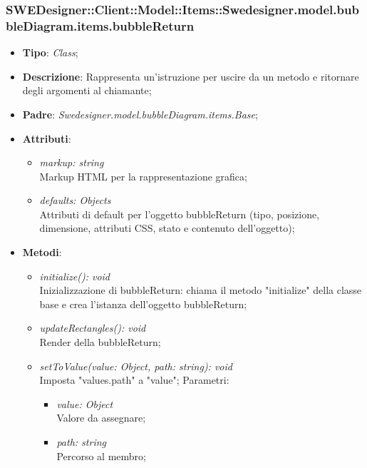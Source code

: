 \documentclass[../DefinizioneDiProdotto.tex]{subfiles}
\begin{document}
			\subsubsection{SWEDesigner::Client::Model::Items::Swedesigner.model.bubbleDiagram.items.bubbleReturn}
			\hypertarget{SWEDesigner::Client::Model::Items::Swedesigner.model.bubbleDiagram.items.bubbleReturn}{}
			\begin{itemize}
				\item \textbf{Tipo}: \emph{Class};
				\item \textbf{Descrizione}: Rappresenta un'istruzione per uscire da un metodo e ritornare degli argomenti al chiamante;
				\item \textbf{Padre}: \emph{Swedesigner.model.bubbleDiagram.items.Base};
				\item \textbf{Attributi}:
				\begin{itemize}
					\item \emph{markup: string}\\
					Markup HTML per la rappresentazione grafica;
					\item \emph{defaults: Objects}\\
					Attributi di default per l'oggetto bubbleReturn (tipo, posizione, dimensione, attributi CSS, stato e contenuto dell'oggetto);
				\end{itemize}
				\item \textbf{Metodi}:
				\begin{itemize}
					\item \emph{initialize(): void}\\
					Inizializzazione di bubbleReturn: chiama il metodo "initialize" della classe base e crea l'istanza dell'oggetto bubbleReturn;
					\item \emph{updateRectangles(): void}\\
					Render della bubbleReturn;
					\item \emph{setToValue(value: Object, path: string): void}\\
					Imposta "values.path" a "value";
					Parametri:
					\begin{itemize}
						\item \emph{value: Object} \\
						Valore da assegnare;
						\item \emph{path: string} \\
						Percorso al membro;
					\end{itemize}
				\end{itemize}
			\end{itemize}
			
\end{document}
